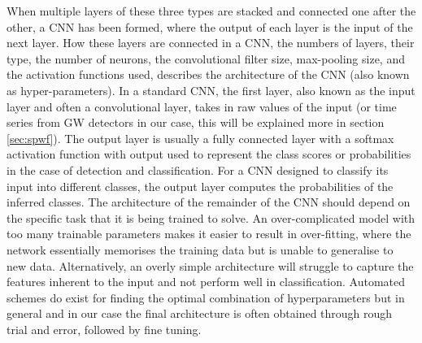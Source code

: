 \documentclass[aps,twocolumn,showpacs,groupedaddress, nofootinbib]{revtex4}  %
\begin{document}
When multiple layers of these three types are stacked and connected one after
the other, a \ac{CNN} has been formed, where the output of each layer is the
input of the next layer. 
%
%
How these layers are connected in a \ac{CNN}, the
numbers of layers, their type, the number of neurons, the convolutional filter
size, max-pooling size, and the activation functions used, describes the
architecture of the \ac{CNN} (also known as hyper-parameters).  
In a standard \ac{CNN}, 
the first layer, also known as the input layer and often a convolutional layer, 
takes in raw values of the input (or time series from \ac{GW} detectors in our case, this will be explained more in section \ref{sec:spwf}).
The output layer is usually a fully connected layer
with a softmax activation function with output used to represent the class
scores or probabilities in the case of detection and classification.
For a \ac{CNN} designed to classify its input into different classes, 
the output layer computes the probabilities of the inferred classes.
The architecture of the remainder of the \ac{CNN} should depend on the specific task that it is being
trained to solve. An over-complicated model with too many trainable parameters
makes it easier to result in over-fitting, where the network
essentially memorises the training data but is unable to generalise to new
data. Alternatively, an overly simple architecture will struggle to capture
the features inherent to the input and not perform well in classification.
Automated schemes do exist for finding the optimal combination of
hyperparameters but in general and in our case the final architecture is
often obtained through rough trial and error, followed by fine tuning.
\end{document}
